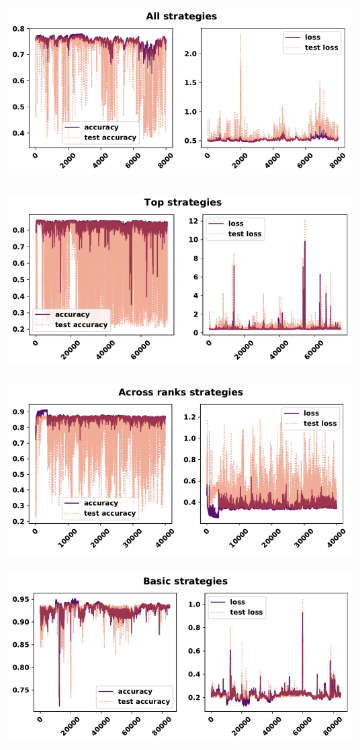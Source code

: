 \begin{figure}[!htbp]
    \begin{subfigure}{\textwidth}
    \centering
    \includegraphics[width=.8\textwidth]{src/chapters/07/img/validation_plot_classification_all_strategies.pdf}
    \end{subfigure}\hfill
    \begin{subfigure}{\textwidth}
    \centering
    \includegraphics[width=.8\textwidth]{src/chapters/07/img/validation_plot_classification_top_strategies.pdf}
    \end{subfigure}
    \begin{subfigure}{\textwidth}
    \centering
    \includegraphics[width=.8\textwidth]{src/chapters/07/img/validation_plot_classification_across_ranks_strategies.pdf}
    \end{subfigure}
    \begin{subfigure}{\textwidth}
    \centering
    \includegraphics[width=.8\textwidth]{src/chapters/07/img/validation_plot_classification_basic_strategies.pdf}

\end{subfigure}
\end{figure}
